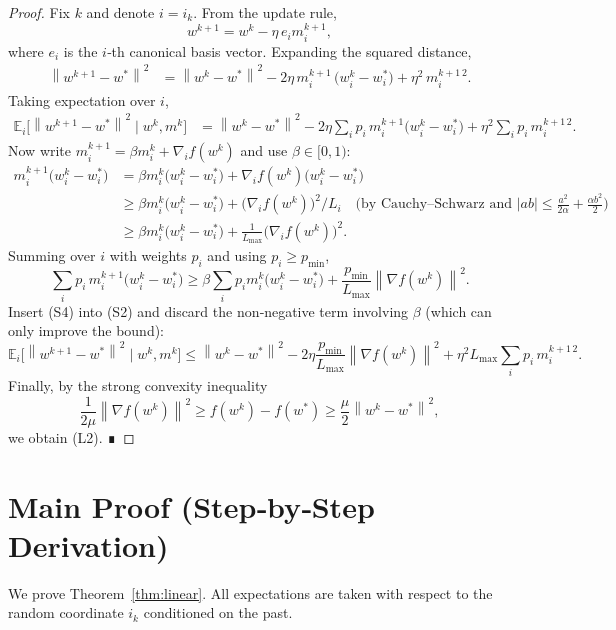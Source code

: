 \documentclass{article}
\newcommand{\E}{\mathbb{E}}
\newcommand{\norm}[1]{\left\lVert#1\right\rVert}
\begin{document}
\begin{proof}
Fix $k$ and denote $i=i_k$. From the update rule,
\[
w^{k+1}=w^{k}-\eta\,e_i m_{i}^{k+1},
\]
where $e_i$ is the $i$‑th canonical basis vector. Expanding the squared distance,
\[
\begin{aligned}
\norm{w^{k+1}-w^{*}}^{2}
&= \norm{w^{k}-w^{*}}^{2}
-2\eta\,m_{i}^{k+1}\,\bigl(w_{i}^{k}-w_{i}^{*}\bigr)
+\eta^{2} \,m_{i}^{k+1\,2}.
\end{aligned}
\tag{S1}
\]
Taking expectation over $i$,
\[
\begin{aligned}
\E_{i}\!\bigl[\norm{w^{k+1}-w^{*}}^{2}\mid w^{k},m^{k}\bigr]
&= \norm{w^{k}-w^{*}}^{2}
-2\eta\sum_{i}p_i\,m_{i}^{k+1}\bigl(w_{i}^{k}-w_{i}^{*}\bigr)
+\eta^{2}\sum_{i}p_i\,m_{i}^{k+1\,2}.
\end{aligned}
\tag{S2}
\]
Now write $m_{i}^{k+1}= \beta m_{i}^{k}+ \nabla_i f(w^{k})$ and use $\beta\in[0,1)$:
\[
\begin{aligned}
m_{i}^{k+1}\bigl(w_{i}^{k}-w_{i}^{*}\bigr)
&= \beta m_{i}^{k}\bigl(w_{i}^{k}-w_{i}^{*}\bigr)
+ \nabla_i f(w^{k})\bigl(w_{i}^{k}-w_{i}^{*}\bigr)\\
&\ge \beta m_{i}^{k}\bigl(w_{i}^{k}-w_{i}^{*}\bigr)
+ \bigl(\nabla_i f(w^{k})\bigr)^{2}/L_i \quad\text{(by Cauchy–Schwarz and }|a b|\le \tfrac{a^{2}}{2\alpha}+\tfrac{\alpha b^{2}}{2})\\
&\ge \beta m_{i}^{k}\bigl(w_{i}^{k}-w_{i}^{*}\bigr)
+ \frac{1}{L_{\max}}\bigl(\nabla_i f(w^{k})\bigr)^{2}.
\end{aligned}
\tag{S3}
\]
Summing over $i$ with weights $p_i$ and using $p_i\ge p_{\min}$,
\[
\sum_{i}p_i\,m_{i}^{k+1}\bigl(w_{i}^{k}-w_{i}^{*}\bigr)
\ge \beta\sum_{i}p_i m_{i}^{k}\bigl(w_{i}^{k}-w_{i}^{*}\bigr)
+\frac{p_{\min}}{L_{\max}}\norm{\nabla f(w^{k})}^{2}.
\tag{S4}
\]
Insert (S4) into (S2) and discard the non‑negative term involving $\beta$ (which can only improve the bound):
\[
\E_{i}\!\bigl[\norm{w^{k+1}-w^{*}}^{2}\mid w^{k},m^{k}\bigr]
\le \norm{w^{k}-w^{*}}^{2}
-2\eta\frac{p_{\min}}{L_{\max}}\norm{\nabla f(w^{k})}^{2}
+\eta^{2}L_{\max}\sum_{i}p_i\,m_{i}^{k+1\,2}.
\tag{S5}
\]
Finally, by the strong convexity inequality
\[
\frac{1}{2\mu}\norm{\nabla f(w^{k})}^{2}\ge f(w^{k})-f(w^{*})\ge
\frac{\mu}{2}\norm{w^{k}-w^{*}}^{2},
\]
we obtain (L2). ∎
\end{proof}

\section*{Main Proof (Step‑by‑Step Derivation)}
We prove Theorem~\ref{thm:linear}.  
All expectations are taken with respect to the random coordinate $i_k$ conditioned on the past.
\end{document}
